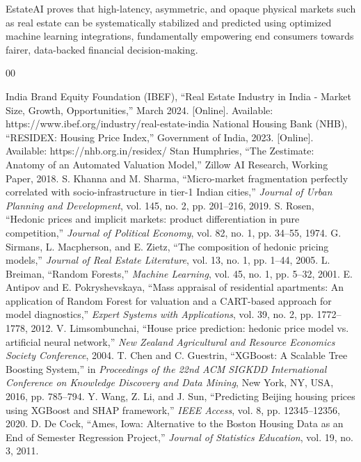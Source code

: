 \documentclass[conference]{IEEEtran}
\begin{document}
EstateAI proves that high-latency, asymmetric, and opaque physical markets such as real estate can be systematically stabilized and predicted using optimized machine learning integrations, fundamentally empowering end consumers towards fairer, data-backed financial decision-making.

\begin{thebibliography}{00}

 India Brand Equity Foundation (IBEF), ``Real Estate Industry in India - Market Size, Growth, Opportunities,'' March 2024. [Online]. Available: https://www.ibef.org/industry/real-estate-india
 National Housing Bank (NHB), ``RESIDEX: Housing Price Index,'' Government of India, 2023. [Online]. Available: https://nhb.org.in/residex/
 Stan Humphries, ``The Zestimate: Anatomy of an Automated Valuation Model,'' Zillow AI Research, Working Paper, 2018.
 S. Khanna and M. Sharma, ``Micro-market fragmentation perfectly correlated with socio-infrastructure in tier-1 Indian cities,'' \textit{Journal of Urban Planning and Development}, vol. 145, no. 2, pp. 201--216, 2019.
 S. Rosen, ``Hedonic prices and implicit markets: product differentiation in pure competition,'' \textit{Journal of Political Economy}, vol. 82, no. 1, pp. 34--55, 1974.
 G. Sirmans, L. Macpherson, and E. Zietz, ``The composition of hedonic pricing models,'' \textit{Journal of Real Estate Literature}, vol. 13, no. 1, pp. 1--44, 2005.
 L. Breiman, ``Random Forests,'' \textit{Machine Learning}, vol. 45, no. 1, pp. 5--32, 2001.
 E. Antipov and E. Pokryshevskaya, ``Mass appraisal of residential apartments: An application of Random Forest for valuation and a CART-based approach for model diagnostics,'' \textit{Expert Systems with Applications}, vol. 39, no. 2, pp. 1772--1778, 2012.
 V. Limsombunchai, ``House price prediction: hedonic price model vs. artificial neural network,'' \textit{New Zealand Agricultural and Resource Economics Society Conference}, 2004.
 T. Chen and C. Guestrin, ``XGBoost: A Scalable Tree Boosting System,'' in \textit{Proceedings of the 22nd ACM SIGKDD International Conference on Knowledge Discovery and Data Mining}, New York, NY, USA, 2016, pp. 785--794.
 Y. Wang, Z. Li, and J. Sun, ``Predicting Beijing housing prices using XGBoost and SHAP framework,'' \textit{IEEE Access}, vol. 8, pp. 12345--12356, 2020.
 D. De Cock, ``Ames, Iowa: Alternative to the Boston Housing Data as an End of Semester Regression Project,'' \textit{Journal of Statistics Education}, vol. 19, no. 3, 2011.

\end{thebibliography}
\end{document}
